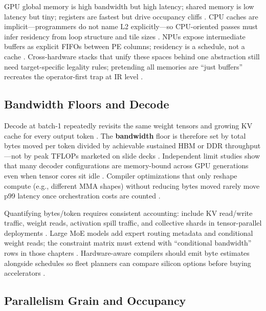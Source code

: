 GPU global memory is high bandwidth but high latency; shared memory is low latency but tiny; registers are fastest but drive occupancy cliffs \citep{nvidia2022hopper}.
CPU caches are implicit---programmers do not name L2 explicitly---so CPU-oriented passes must infer residency from loop structure and tile sizes \citep{dlbook}.
NPUs expose intermediate buffers as explicit FIFOs between PE columns; residency is a schedule, not a cache \citep{amd2024xdna}.
Cross-hardware stacks that unify these spaces behind one abstraction still need target-specific legality rules; pretending all memories are ``just buffers'' recreates the operator-first trap at IR level \citep{patel2025llminference,memoryfloor2026}.

\subsection{Bandwidth Floors and Decode}
\label{sec:ch03_bandwidth_floors}

Decode at batch-1 repeatedly revisits the same weight tensors and growing KV cache for every output token \citep{patel2025llminference,memoryfloor2026}.
The \textbf{bandwidth} floor is therefore set by total bytes moved per token divided by achievable sustained HBM or DDR throughput---not by peak TFLOPs marketed on slide decks \citep{memoryfloor2026}.
Independent limit studies show that many decoder configurations are memory-bound across GPU generations even when tensor cores sit idle \citep{patel2025llminference,memoryfloor2026}.
Compiler optimizations that only reshape compute (e.g., different MMA shapes) without reducing bytes moved rarely move p99 latency once orchestration costs are counted \citep{taxbreak2026}.

Quantifying bytes/token requires consistent accounting: include KV read/write traffic, weight reads, activation spill traffic, and collective shards in tensor-parallel deployments \citep{liu2024deepseekv3,patel2025llminference}.
Large MoE models add expert routing metadata and conditional weight reads; the constraint matrix must extend with ``conditional bandwidth'' rows in those chapters \citep{liu2024deepseekv3}.
Hardware-aware compilers should emit byte estimates alongside schedules so fleet planners can compare silicon options before buying accelerators \citep{patel2025llminference,memoryfloor2026}.

\subsection{Parallelism Grain and Occupancy}
\label{sec:ch03_parallel_grain}

